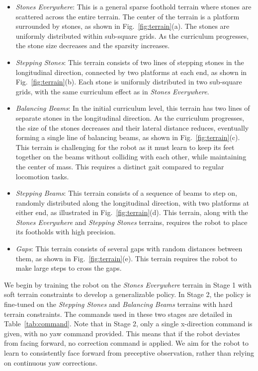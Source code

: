\begin{itemize}
    \item \textit{Stones Everywhere}: This is a general sparse foothold terrain where stones are scattered across the entire terrain. The center of the terrain is a platform surrounded by stones, as shown in Fig.~\ref{fig:terrain}(a). The stones are uniformly distributed within sub-square grids. As the curriculum progresses, the stone size decreases and the sparsity increases.
    
    \item \textit{Stepping Stones}: This terrain consists of two lines of stepping stones in the longitudinal direction, connected by two platforms at each end, as shown in Fig.~\ref{fig:terrain}(b). Each stone is uniformly distributed in two sub-square grids, with the same curriculum effect as in \textit{Stones Everywhere}.
    
    \item \textit{Balancing Beams}: In the initial curriculum level, this terrain has two lines of separate stones in the longitudinal direction. As the curriculum progresses, the size of the stones decreases and their lateral distance reduces, eventually forming a single line of balancing beams, as shown in Fig.~\ref{fig:terrain}(c). This terrain is challenging for the robot as it must learn to keep its feet together on the beams without colliding with each other, while maintaining the center of mass. This requires a distinct gait compared to regular locomotion tasks.
    
    \item \textit{Stepping Beams}: This terrain consists of a sequence of beams to step on, randomly distributed along the longitudinal direction, with two platforms at either end, as illustrated in Fig.~\ref{fig:terrain}(d). This terrain, along with the \textit{Stones Everywhere} and \textit{Stepping Stones} terrains, requires the robot to place its footholds with high precision.
    
    \item \textit{Gaps}: This terrain consists of several gaps with random distances between them, as shown in Fig.~\ref{fig:terrain}(e). This terrain requires the robot to make large steps to cross the gaps.
\end{itemize}

We begin by training the robot on the \textit{Stones Everywhere} terrain in Stage 1 with soft terrain constraints to develop a generalizable policy. In Stage 2, the policy is fine-tuned on the \textit{Stepping Stones} and \textit{Balancing Beams} terrains with hard terrain constraints. The commands used in these two stages are detailed in Table~\ref{tab:command}. Note that in Stage 2, only a single x-direction command is given, with no yaw command provided. This means that if the robot deviates from facing forward, no correction command is applied. We aim for the robot to learn to consistently face forward from preceptive observation, rather than relying on continuous yaw corrections.

